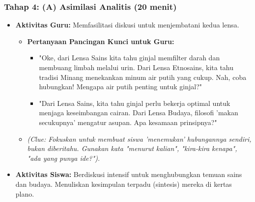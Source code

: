 \documentclass[a4paper,12pt]{article}
\begin{document}
\subsubsection{Tahap 4: (A) Asimilasi Analitis (20 menit)}
\begin{itemize}
\item \textbf{Aktivitas Guru:} Memfasilitasi diskusi untuk menjembatani kedua lensa.
    \begin{itemize}
    \item \textbf{Pertanyaan Pancingan Kunci untuk Guru:}
        \begin{itemize}
        \item "Oke, dari Lensa Sains kita tahu ginjal memfilter darah dan membuang limbah melalui urin. Dari Lensa Etnosains, kita tahu tradisi Minang menekankan minum air putih yang cukup. Nah, coba hubungkan! Mengapa air putih penting untuk ginjal?"
        \item "Dari Lensa Sains, kita tahu ginjal perlu bekerja optimal untuk menjaga keseimbangan cairan. Dari Lensa Budaya, filosofi 'makan secukupnya' mengatur asupan. Apa kesamaan prinsipnya?"
        \end{itemize}
    \item \textit{(Clue: Fokuskan untuk membuat siswa 'menemukan' hubungannya sendiri, bukan diberitahu. Gunakan kata "menurut kalian", "kira-kira kenapa", "ada yang punya ide?").}
    \end{itemize}
\item \textbf{Aktivitas Siswa:} Berdiskusi intensif untuk menghubungkan temuan sains dan budaya. Menuliskan kesimpulan terpadu (sintesis) mereka di kertas plano.
\end{itemize}
\end{document}
